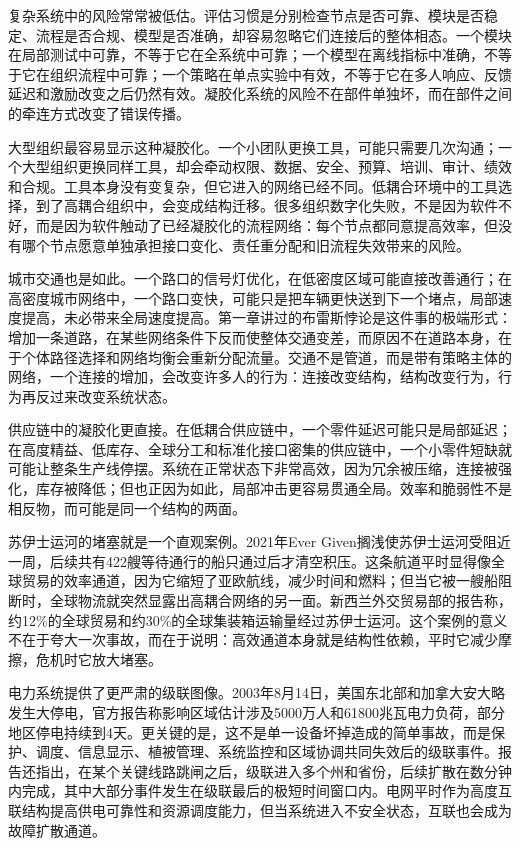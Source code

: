 复杂系统中的风险常常被低估。评估习惯是分别检查节点是否可靠、模块是否稳定、流程是否合规、模型是否准确，却容易忽略它们连接后的整体相态。一个模块在局部测试中可靠，不等于它在全系统中可靠；一个模型在离线指标中准确，不等于它在组织流程中可靠；一个策略在单点实验中有效，不等于它在多人响应、反馈延迟和激励改变之后仍然有效。凝胶化系统的风险不在部件单独坏，而在部件之间的牵连方式改变了错误传播。

大型组织最容易显示这种凝胶化。一个小团队更换工具，可能只需要几次沟通；一个大型组织更换同样工具，却会牵动权限、数据、安全、预算、培训、审计、绩效和合规。工具本身没有变复杂，但它进入的网络已经不同。低耦合环境中的工具选择，到了高耦合组织中，会变成结构迁移。很多组织数字化失败，不是因为软件不好，而是因为软件触动了已经凝胶化的流程网络：每个节点都同意提高效率，但没有哪个节点愿意单独承担接口变化、责任重分配和旧流程失效带来的风险。

城市交通也是如此。一个路口的信号灯优化，在低密度区域可能直接改善通行；在高密度城市网络中，一个路口变快，可能只是把车辆更快送到下一个堵点，局部速度提高，未必带来全局速度提高。第一章讲过的布雷斯悖论是这件事的极端形式：增加一条道路，在某些网络条件下反而使整体交通变差，而原因不在道路本身，在于个体路径选择和网络均衡会重新分配流量。交通不是管道，而是带有策略主体的网络，一个连接的增加，会改变许多人的行为：连接改变结构，结构改变行为，行为再反过来改变系统状态。

供应链中的凝胶化更直接。在低耦合供应链中，一个零件延迟可能只是局部延迟；在高度精益、低库存、全球分工和标准化接口密集的供应链中，一个小零件短缺就可能让整条生产线停摆。系统在正常状态下非常高效，因为冗余被压缩，连接被强化，库存被降低；但也正因为如此，局部冲击更容易贯通全局。效率和脆弱性不是相反物，而可能是同一个结构的两面。

苏伊士运河的堵塞就是一个直观案例。2021年Ever Given搁浅使苏伊士运河受阻近一周，后续共有422艘等待通行的船只通过后才清空积压\cite{suez2021}。这条航道平时显得像全球贸易的效率通道，因为它缩短了亚欧航线，减少时间和燃料；但当它被一艘船阻断时，全球物流就突然显露出高耦合网络的另一面。新西兰外交贸易部的报告称，约12\%的全球贸易和约30\%的全球集装箱运输量经过苏伊士运河\cite{nzmfat2021}。这个案例的意义不在于夸大一次事故，而在于说明：高效通道本身就是结构性依赖，平时它减少摩擦，危机时它放大堵塞。

电力系统提供了更严肃的级联图像。2003年8月14日，美国东北部和加拿大安大略发生大停电，官方报告称影响区域估计涉及5000万人和61800兆瓦电力负荷，部分地区停电持续到4天\cite{uscanada2004}。更关键的是，这不是单一设备坏掉造成的简单事故，而是保护、调度、信息显示、植被管理、系统监控和区域协调共同失效后的级联事件。报告还指出，在某个关键线路跳闸之后，级联进入多个州和省份，后续扩散在数分钟内完成，其中大部分事件发生在级联最后的极短时间窗口内\cite{uscanada2004}。电网平时作为高度互联结构提高供电可靠性和资源调度能力，但当系统进入不安全状态，互联也会成为故障扩散通道。

